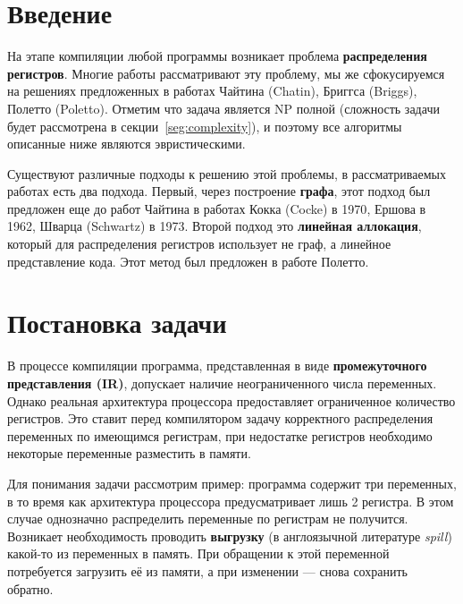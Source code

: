 



\section{Введение}

На этапе компиляции любой программы возникает проблема \textbf{распределения регистров}. %
Многие работы рассматривают эту проблему, мы же сфокусируемся на решениях предложенных в
работах Чайтина (Chatin)\cite{chaitin1982}, Бриггса (Briggs)\cite{briggs1994}, Полетто (Poletto)\cite{poletto1999}. %
Отметим что задача является NP полной (сложность задачи будет рассмотрена в секции~\ref{seg:complexity}),
и поэтому все алгоритмы описанные ниже являются эвристическими.

Существуют различные подходы к решению этой проблемы, в рассматриваемых работах есть два подхода.
Первый, через построение \textbf{графа}, этот подход был предложен еще до работ Чайтина в работах Кокка
(Cocke) в 1970\cite{cocke1970}, Ершова в 1962\cite{ershov1962}, Шварца (Schwartz) в 1973\cite{schwartz1973}. %
Второй подход это \textbf{линейная аллокация}, который для распределения регистров использует не граф,
а линейное представление кода. Этот метод был предложен в работе Полетто.

\section{Постановка задачи}

В процессе компиляции программа, представленная в виде \textbf{промежуточного представления (IR)}, допускает
наличие неограниченного числа переменных. Однако реальная архитектура процессора предоставляет ограниченное
количество регистров. Это ставит перед компилятором задачу корректного распределения переменных по имеющимся
регистрам, при недостатке регистров необходимо некоторые переменные разместить в памяти. %

Для понимания задачи рассмотрим пример: программа содержит три переменных, в то время как архитектура
процессора предусматривает лишь 2 регистра. В этом случае однозначно распределить переменные по регистрам
не получится. Возникает необходимость проводить \textbf{выгрузку} (в англоязычной литературе \textit{spill})
какой-то из переменных в память. При обращении к этой переменной потребуется загрузить
её из памяти, а при изменении — снова сохранить обратно.

